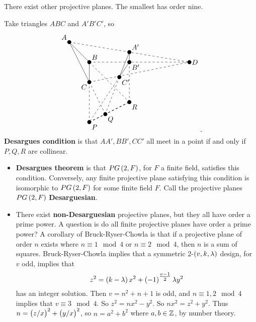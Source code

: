 \begin{note*}
There exist other projective planes. The smallest has order nine.
\end{note*}

Take triangles $ ABC $ and $ A'B'C' $, so
$$
\begin{tikzpicture}
\fill (0, 0) circle (0.1) node[above left]{$ A $};
\fill (1, -1) circle (0.1) node[above right]{$ B $};
\fill (1, -2) circle (0.1) node[below left]{$ C $};
\draw (0, 0) to (1, -2);
\draw (0, 0) to (1, -1);
\draw (1, -1) to (1, -2);
\fill (3, -0.5) circle (0.1) node[above right]{$ A' $};
\fill (3, -1) circle (0.1) node[below right]{$ B' $};
\fill (2.5, -1.75) circle (0.1) node[below right]{$ C' $};
\draw (3, -0.5) to (2.5, -1.75);
\draw (3, -0.5) to (3, -1);
\draw (3, -1) to (2.5, -1.75);
\fill (6, -1) circle (0.1) node[right]{$ D $};
\draw [dashed] (0, 0) to (6, -1);
\draw [dashed] (1, -1) to (6, -1);
\draw [dashed] (1, -2) to (6, -1);
\fill (1, -4) circle (0.1) node[below right]{$ P $};
\draw [dashed] (1, -2) to (1, -4);
\draw [dashed] (2.5, -1.75) to (1, -4);
\fill (1.8, -3.6) circle (0.1) node[below right]{$ Q $};
\draw [dashed] (1, -2) to (1.8, -3.6);
\draw [dashed] (2.5, -1.75) to (1.8, -3.6);
\fill (3, -3) circle (0.1) node[below right]{$ R $};
\draw [dashed] (1, -1) to (3, -3);
\draw [dashed] (3, -1) to (3, -3);
\draw [dashed, thick] (1, -4) to (3, -3);
\end{tikzpicture}.
$$
\textbf{Desargues condition} is that $ AA', BB', CC' $ all meet in a point if and only if $ P, Q, R $ are collinear.
\begin{itemize}
\item \textbf{Desargues theorem} is that $ PG\br{2, F} $, for $ F $ a finite field, satisfies this condition. Conversely, any finite projective plane satisfying this condition is isomorphic to $ PG\br{2, F} $ for some finite field $ F $. Call the projective planes $ PG\br{2, F} $ \textbf{Desarguesian}.
\item There exist \textbf{non-Desarguesian} projective planes, but they all have order a prime power. A question is do all finite projective planes have order a prime power? A corollary of Bruck-Ryser-Chowla is that if a projective plane of order $ n $ exists where $ n \equiv 1 \mod 4 $ or $ n \equiv 2 \mod 4 $, then $ n $ is a sum of squares. Bruck-Ryser-Chowla implies that a symmetric $ 2 $-$ \br{v, k, \lambda} $ design, for $ v $ odd, implies that
$$ z^2 = \br{k - \lambda}x^2 + \br{-1}^{\tfrac{v - 1}{2}}\lambda y^2 $$
has an integer solution. Then $ v = n^2 + n + 1 $ is odd, and $ n \equiv 1, 2 \mod 4 $ implies that $ v \equiv 3 \mod 4 $. So $ z^2 = nx^2 - y^2 $. So $ nx^2 = z^2 + y^2 $. Thus $ n = \br{z / x}^2 + \br{y / x}^2 $, so $ n = a^2 + b^2 $ where $ a, b \in \mathbb{Z} $, by number theory.
\end{itemize}

